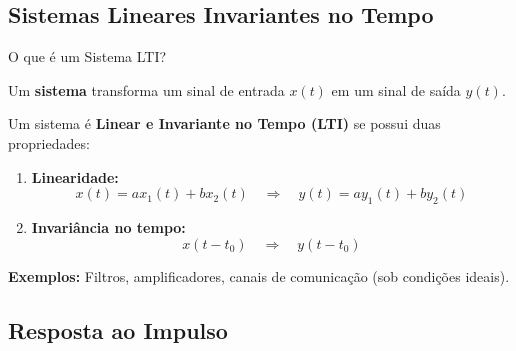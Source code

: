 
\subsection{Sistemas Lineares Invariantes no Tempo}

\begin{frame}{O que é um Sistema LTI?}

Um \textbf{sistema} transforma um sinal de entrada $x(t)$ em um sinal de saída $y(t)$.

\begin{center}
\end{center}

\vspace{0.1cm}

Um sistema é \textbf{Linear e Invariante no Tempo (LTI)} se possui duas propriedades:

\begin{enumerate}
\item \textbf{Linearidade:}
\[
x(t) = ax_1(t) + bx_2(t) \quad \Rightarrow \quad y(t) = ay_1(t) + by_2(t)
\]

\item \textbf{Invariância no tempo:}
\[
x(t - t_0) \quad \Rightarrow \quad y(t - t_0)
\]
\end{enumerate}

\textbf{Exemplos:} Filtros, amplificadores, canais de comunicação (sob condições ideais).

\end{frame}


\subsection{Resposta ao Impulso}

